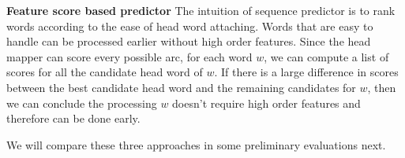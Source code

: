 \textbf{Feature score based predictor }The intuition of sequence predictor
is to rank words according to the ease of head word attaching.
Words that are easy to handle can be processed earlier without high order features.
Since the head mapper can score every possible arc,
for each word $w$, we can compute a list of scores for all the candidate
head word of $w$. If there is a large difference in scores between the best
candidate head word and the remaining candidates for $w$,
then we can conclude the processing $w$ doesn't require high order features
and therefore can be done early.

We will compare these three approaches in some preliminary evaluations next.

